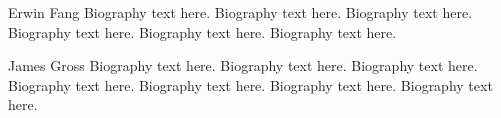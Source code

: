\documentclass[10pt,journal,compsoc]{IEEEtran}
\theoremstyle{mytheoremstyle}
\theoremstyle{mytheoremstyle}
\theoremstyle{mytheoremstyle}
\begin{document}
\begin{IEEEbiography}{Erwin Fang}
Biography text here.
Biography text here.
Biography text here.
Biography text here.
Biography text here.
Biography text here.

\end{IEEEbiography}

\begin{IEEEbiography}{James Gross}
Biography text here.
Biography text here.
Biography text here.
Biography text here.
Biography text here.
Biography text here.
Biography text here.

\end{IEEEbiography}
\end{document}
